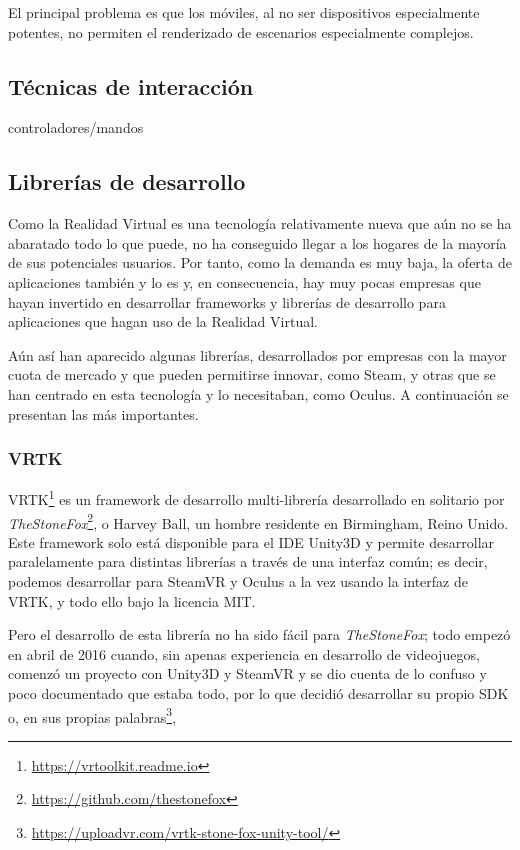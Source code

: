 El principal problema es que los móviles, al no ser dispositivos especialmente potentes, no permiten el renderizado de escenarios especialmente complejos.


\subsection{Técnicas de interacción}

controladores/mandos

\subsection{Librerías de desarrollo}

Como la Realidad Virtual es una tecnología relativamente nueva que aún no se ha abaratado todo lo que puede, no ha conseguido llegar a los hogares de la mayoría de sus potenciales usuarios. Por tanto, como la demanda es muy baja, la oferta de aplicaciones también y lo es y, en consecuencia, hay muy pocas empresas que hayan invertido en desarrollar frameworks y librerías de desarrollo para aplicaciones que hagan uso de la Realidad Virtual.

Aún así han aparecido algunas librerías, desarrollados por empresas con la mayor cuota de mercado y que pueden permitirse innovar, como Steam, y otras que se han centrado en esta tecnología y lo necesitaban, como Oculus. A continuación se presentan las más importantes.

\subsubsection{VRTK}

\acl{VRTK}\footnote{\url{https://vrtoolkit.readme.io}} es un framework de desarrollo multi-librería desarrollado en solitario por \textit{TheStoneFox}\footnote{\url{https://github.com/thestonefox}}, o Harvey Ball, un hombre residente en Birmingham, Reino Unido. Este framework solo está disponible para el \acs{IDE} Unity3D y permite desarrollar paralelamente para distintas librerías a través de una interfaz común; es decir, podemos desarrollar para SteamVR y Oculus a la vez usando la interfaz de \acs{VRTK}, y todo ello bajo la licencia \acs{MIT}.

Pero el desarrollo de esta librería no ha sido fácil para \textit{TheStoneFox}; todo empezó en abril de 2016 cuando, sin apenas experiencia en desarrollo de videojuegos, comenzó un proyecto con Unity3D y SteamVR y se dio cuenta de lo confuso y poco documentado que estaba todo, por lo que decidió desarrollar su propio \acs{SDK} o, en sus propias palabras\footnote{\url{https://uploadvr.com/vrtk-stone-fox-unity-tool/}},

